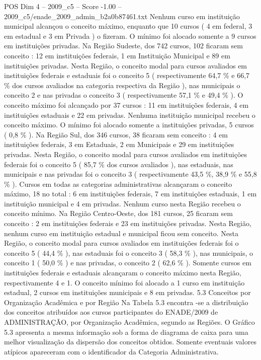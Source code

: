 \begin{textsample}{POS Dim 4 – 2009\_c5 – Score -1.00 – 2009\_c5/enade\_2009\_admin\_b2a0b87461.txt}
Nenhum curso em instituição municipal alcançou o conceito máximo, enquanto que 10 cursos ( 4 em federal, 3 em estadual e 3 em Privada ) o fizeram.
O mínimo foi alocado somente a 9 cursos em instituições privadas.
Na Região Sudeste, dos 742 cursos, 102 ficaram sem conceito : 12 em instituições federais, 1 em Instituição Municipal e 89 em instituições privadas.
Nesta Região, o conceito modal para cursos avaliados em instituições federais e estaduais foi o conceito 5 ( respectivamente 64,7 \% e 66,7 \% dos cursos avaliados na categoria respectiva da Região ), nas municipais o conceito 2 e nas privadas o conceito 3 ( respectivamente 57,1 \% e 49,4 \% ).
O conceito máximo foi alcançado por 37 cursos : 11 em instituições federais, 4 em instituições estaduais e 22 em privadas.
Nenhuma instituição municipal recebeu o conceito máximo.
O mínimo foi alocado somente a instituições privadas, 5 cursos ( 0,8 \% ).
Na Região Sul, dos 346 cursos, 38 ficaram sem conceito : 4 em instituições federais, 3 em Estaduais, 2 em Municipais e 29 em instituições privadas.
Nesta Região, o conceito modal para cursos avaliados em instituições federais foi o conceito 5 ( 85,7 \% dos cursos avaliados ), nas estaduais, nas municipais e nas privadas foi o conceito 3 ( respectivamente 43,5 \%, 38,9 \% e 55,8 \% ).
Cursos em todas as categorias administrativas alcançaram o conceito máximo, 18 no total : 6 em instituições federais, 7 em instituições estaduais, 1 em instituição municipal e 4 em privadas.
Nenhum curso nesta Região recebeu o conceito mínimo.
Na Região Centro-Oeste, dos 181 cursos, 25 ficaram sem conceito : 2 em instituições federais e 23 em instituições privadas.
Nesta Região, nenhum curso em instituição estadual e municipal ficou sem conceito.
Nesta Região, o conceito modal para cursos avaliados em instituições federais foi o conceito 5 ( 44,4 \% ), nas estaduais foi o conceito 3 ( 58,3 \% ), nas municipais, o conceito 1 ( 50,0 \% ) e nas privadas, o conceito 2 ( 62,6 \% ).
Somente cursos em instituições federais e estaduais alcançaram o conceito máximo nesta Região, respectivamente 4 e 1.
O conceito mínimo foi alocado a 1 curso em instituição estadual, 2 cursos em instituições municipais e 8 em privadas. 5.3 Conceitos por Organização Acadêmica e por Região Na Tabela 5.3 encontra -se a distribuição dos conceitos atribuídos aos cursos participantes do ENADE/2009 de ADMINISTRAÇÃO, por Organização Acadêmica, segundo as Regiões.
O Gráfico 5.3 apresenta a mesma informação sob a forma de diagrama de caixa para uma melhor visualização da dispersão dos conceitos obtidos.
Somente eventuais valores atípicos apareceram com o identificador da Categoria Administrativa.

\end{textsample}
